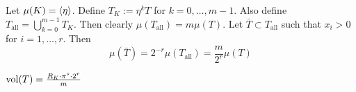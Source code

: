 \documentclass[12pt, a4paper]{article}
\begin{document}
	\newcommand{\Tall}{T_{\text{all}}}

	Let $\mu(K) = \langle \eta \rangle$. Define $T_K := \eta^k T$ for $k = 0, \dots, m-1$.
	Also define $T_{\text{all}} = \bigcup_{k=0}^{m-1} T_K$. Then clearly 
	$\mu(\Tall) = m \mu(T)$. Let $\bar{T} \subset \Tall$ such that 
	$x_i > 0$ for $i = 1, \dots, r$. Then 
	$$\mu(\bar{T}) = 2^{-r} \mu(\Tall) = \frac{m}{2^r}\mu(T)$$

	\begin{prop}{}{}
		$\operatorname{vol}(T) = \frac{R_K \cdot \pi^s \cdot 2^r}{m}$
	\end{prop}
	


	
	
\end{document}
